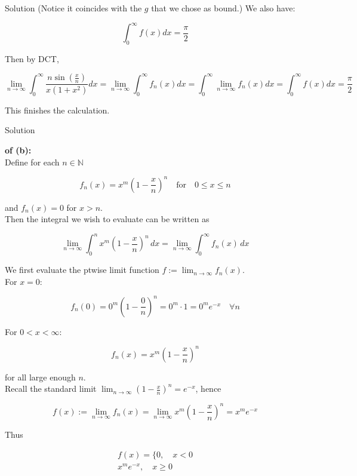 \documentclass{qlnotes-export}
\begin{document}
\begin{qlsolution}{Solution}
(Notice it coincides with the \(g\) that we chose as bound.) We also have:

\[\int_{0}^{\infty}f(x) dx = \frac{\pi}{2}\]

Then by DCT,

\[\lim\limits_{n\rightarrow\infty}\int_{0}^{\infty}\frac{n\sin\left( \frac{x}{n} \right)}{x(1 + x^{2})} dx = \lim\limits_{n\rightarrow\infty}\int_{0}^{\infty}f_{n}(x) dx = \int_{0}^{\infty}\lim\limits_{n\rightarrow\infty}f_{n}(x) dx = \int_{0}^{\infty}f(x) dx = \frac{\pi}{2}\]

This finishes the calculation.

\end{qlsolution}

\begin{qlsolution}{Solution}

\textbf{of (b):}\\
Define for each \(n \in {\mathbb{N}}\)

\[f_{n}(x) = x^{m}\left( {1 - \frac{x}{n}} \right)^{n}\quad\text{for}\quad 0 \leq x \leq n\]

and \(f_{n}(x) = 0\) for \(x > n\).\\
Then the integral we wish to evaluate can be written as

\[\lim\limits_{n\rightarrow\infty}\int_{0}^{n}x^{m}\left( {1 - \frac{x}{n}} \right)^{n}\, dx = \lim\limits_{n\rightarrow\infty}\int_{0}^{\infty}f_{n}(x)\, dx\]

We first evaluate the ptwise limit function \(f := \lim_{n\rightarrow\infty}f_{n}(x)\).\\
For \(x = 0\):

\[f_{n}(0) = 0^{m}\left( {1 - \frac{0}{n}} \right)^{n} = 0^{m} \cdot 1 = 0^{m}e^{- x}\quad\forall n\]

For \(0 < x < \infty\):

\[f_{n}(x) = x^{m}\left( {1 - \frac{x}{n}} \right)^{n}\]

for all large enough \(n\).\\
Recall the standard limit \(\lim_{n\rightarrow\infty}\left( {1 - \frac{x}{n}} \right)^{n} = e^{- x}\), hence

\[f(x) := \lim\limits_{n\rightarrow\infty}f_{n}(x) = \lim\limits_{n\rightarrow\infty}x^{m}\left( {1 - \frac{x}{n}} \right)^{n} = x^{m}e^{- x}\]

Thus

\[\begin{matrix}
{f(x) = \{ 0,\quad x < 0} \\
{x^{m}e^{- x},\quad x \geq 0}
\end{matrix}\]


\end{qlsolution}
\end{document}
